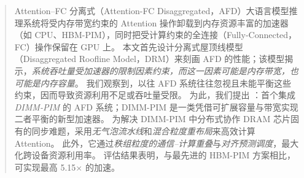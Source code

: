 \begin{abstract}
Attention--FC 分离式（Attention-FC Disaggregated，AFD）大语言模型推理系统将受内存带宽约束的 Attention 操作卸载到内存资源丰富的加速器（如 CPU、HBM-PIM），同时把受计算约束的全连接（Fully-Connected，FC）操作保留在 GPU 上。
本文首先设计分离式屋顶线模型（Disaggregated Roofline Model，DRM）来刻画 AFD 的性能；该模型揭示，\emph{系统吞吐量受加速器的限制因素约束，而这一因素可能是内存带宽，也可能是内存容量}。
我们观察到，以往 AFD 系统往往忽视且未能平衡这些约束，因而导致资源利用不足或吞吐量受限。
为此，我们提出 \sys：首个集成 \textit{DIMM-PIM} 的 AFD 系统；DIMM-PIM 是一类凭借可扩展容量与带宽实现二者平衡的新型加速器。
为解决 DIMM-PIM 中分布式协作 DRAM 芯片固有的同步难题，\sys 采用\emph{无气泡流水线}和\emph{混合粒度重布局}来高效计算 Attention。
此外，它通过\emph{秩组粒度的通信--计算重叠}与\emph{对齐预测调度}，最大化跨设备资源利用率。
评估结果表明，与最先进的 HBM-PIM 方案相比，\sys 可实现最高 5.15$\times$ 的加速。
\end{abstract}
